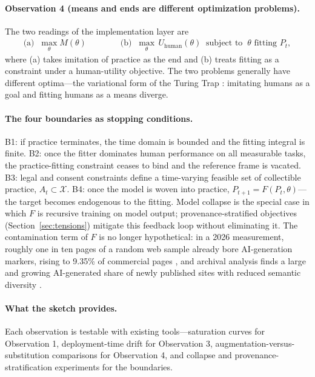 \documentclass[10pt]{article}
\begin{document}
\paragraph{Observation 4 (means and ends are different optimization problems).}
The two readings of the implementation layer are
\begin{align*}
\text{(a)}\;\; \max_\theta M(\theta) \qquad\qquad
\text{(b)}\;\; \max_\theta\, U_{\mathrm{human}}(\theta) \;\; \text{subject to} \;\; \theta \text{ fitting } P_t,
\end{align*}
where (a) takes imitation of practice as the end and (b) treats fitting as a constraint under a human-utility objective. The two problems generally have different optima---the variational form of the Turing Trap \cite{brynjolfsson2022turing}: imitating humans as a goal and fitting humans as a means diverge.

\paragraph{The four boundaries as stopping conditions.}
B1: if practice terminates, the time domain is bounded and the fitting integral is finite. B2: once the fitter dominates human performance on all measurable tasks, the practice-fitting constraint ceases to bind and the reference frame is vacated. B3: legal and consent constraints define a time-varying feasible set of collectible practice, $A_t \subset \mathcal{X}$. B4: once the model is woven into practice, $P_{t+1} = F(P_t, \theta)$---the target becomes endogenous to the fitting. Model collapse \cite{shumailov2024collapse} is the special case in which $F$ is recursive training on model output; provenance-stratified objectives (Section~\ref{sec:tensions}) mitigate this feedback loop without eliminating it. The contamination term of $F$ is no longer hypothetical: in a 2026 measurement, roughly one in ten pages of a random web sample already bore AI-generation markers, rising to 9.35\% of commercial pages \cite{pew2026aiweb}, and archival analysis finds a large and growing AI-generated share of newly published sites with reduced semantic diversity \cite{dolezal2026impact}.

\paragraph{What the sketch provides.}
Each observation is testable with existing tools---saturation curves for Observation 1, deployment-time drift for Observation 3, augmentation-versus-substitution comparisons for Observation 4, and collapse and provenance-stratification experiments for the boundaries.
\end{document}
